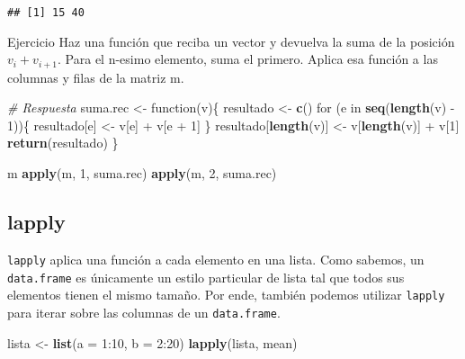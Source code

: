 \documentclass[]{article}
\newenvironment{Shaded}{\begin{snugshade}}{\end{snugshade}}
\newcommand{\KeywordTok}[1]{\textcolor[rgb]{0.13,0.29,0.53}{\textbf{{#1}}}}
\newcommand{\DataTypeTok}[1]{\textcolor[rgb]{0.13,0.29,0.53}{{#1}}}
\newcommand{\DecValTok}[1]{\textcolor[rgb]{0.00,0.00,0.81}{{#1}}}
\newcommand{\StringTok}[1]{\textcolor[rgb]{0.31,0.60,0.02}{{#1}}}
\newcommand{\CommentTok}[1]{\textcolor[rgb]{0.56,0.35,0.01}{\textit{{#1}}}}
\newcommand{\NormalTok}[1]{{#1}}
\begin{document}
\begin{verbatim}
## [1] 15 40
\end{verbatim}

\renewcommand\bcStyleTitre[1]{\large\textcolor{bbblack}{#1}}

\begin{bclogo}[
  couleur=llred,
  arrondi=0,
  logo=\bcstop,
  barre=none,
  noborder=true]{Ejercicio}
Haz una función que reciba un vector y devuelva la suma de la 
posición $v_i + v_{i + 1}$. Para el n-esimo elemento, suma el primero.
Aplica esa función a las columnas y filas de la matriz m.
\end{bclogo}

\begin{Shaded}
\begin{Highlighting}[]
\CommentTok{# Respuesta}
\NormalTok{suma.rec <-}\StringTok{ }\NormalTok{function(v)\{}
  \NormalTok{resultado <-}\StringTok{ }\KeywordTok{c}\NormalTok{()}
  \NormalTok{for (e in }\KeywordTok{seq}\NormalTok{(}\KeywordTok{length}\NormalTok{(v) -}\StringTok{ }\DecValTok{1}\NormalTok{))\{}
    \NormalTok{resultado[e] <-}\StringTok{ }\NormalTok{v[e] +}\StringTok{ }\NormalTok{v[e +}\StringTok{ }\DecValTok{1}\NormalTok{]}
  \NormalTok{\}}
  \NormalTok{resultado[}\KeywordTok{length}\NormalTok{(v)] <-}\StringTok{ }\NormalTok{v[}\KeywordTok{length}\NormalTok{(v)] +}\StringTok{ }\NormalTok{v[}\DecValTok{1}\NormalTok{]}
  \KeywordTok{return}\NormalTok{(resultado)}
\NormalTok{\}}

\NormalTok{m}
\KeywordTok{apply}\NormalTok{(m, }\DecValTok{1}\NormalTok{, suma.rec)}
\KeywordTok{apply}\NormalTok{(m, }\DecValTok{2}\NormalTok{, suma.rec)}
\end{Highlighting}
\end{Shaded}

\subsection{lapply}\label{lapply}

\texttt{lapply} aplica una función a cada elemento en una lista. Como
sabemos, un \texttt{data.frame} es únicamente un estilo particular de
lista tal que todos sus elementos tienen el mismo tamaño. Por ende,
también podemos utilizar \texttt{lapply} para iterar sobre las columnas
de un \texttt{data.frame}.

\begin{Shaded}
\begin{Highlighting}[]
\NormalTok{lista <-}\StringTok{ }\KeywordTok{list}\NormalTok{(}\DataTypeTok{a =} \DecValTok{1}\NormalTok{:}\DecValTok{10}\NormalTok{, }\DataTypeTok{b =} \DecValTok{2}\NormalTok{:}\DecValTok{20}\NormalTok{)}
\KeywordTok{lapply}\NormalTok{(lista, mean)}
\end{Highlighting}
\end{Shaded}
\end{document}
